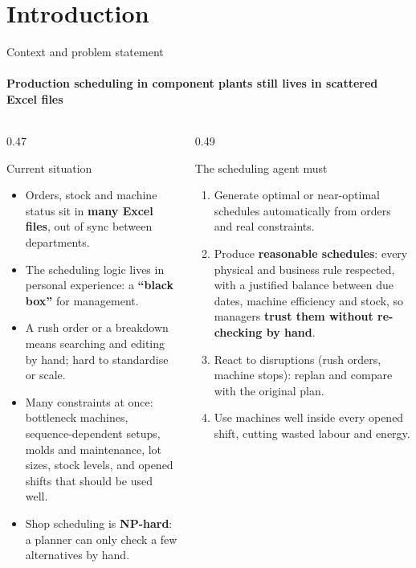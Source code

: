 \section{Introduction}

\begin{frame}{Context and problem statement}
\framesubtitle{Production scheduling in component plants still lives in scattered Excel files}
\begin{columns}[T]
\begin{column}{0.47\textwidth}
\begin{block}{Current situation}
\scriptsize
\begin{itemize}\setlength{\itemsep}{0.25em}
  \item Orders, stock and machine status sit in \textbf{many Excel files}, out of sync between departments.
  \item The scheduling logic lives in personal experience: a \textbf{``black box''} for management.
  \item A rush order or a breakdown means searching and editing by hand; hard to standardise or scale.
  \item Many constraints at once: bottleneck machines, sequence-dependent setups, molds and maintenance,
        lot sizes, stock levels, and opened shifts that should be used well.
  \item Shop scheduling is \textbf{NP-hard}: a planner can only check a few alternatives by hand.
\end{itemize}
\end{block}
\end{column}
\begin{column}{0.49\textwidth}
\begin{block}{The scheduling agent must}
\scriptsize
\begin{enumerate}\setlength{\itemsep}{0.25em}
  \item Generate optimal or near-optimal schedules automatically from orders and real constraints.
  \item Produce \textbf{reasonable schedules}: every physical and business rule respected, with a justified
        balance between due dates, machine efficiency and stock, so managers \textbf{trust them without
        re-checking by hand}.
  \item React to disruptions (rush orders, machine stops): replan and compare with the original plan.
  \item Use machines well inside every opened shift, cutting wasted labour and energy.
\end{enumerate}
\end{block}
\end{column}
\end{columns}
\end{frame}

